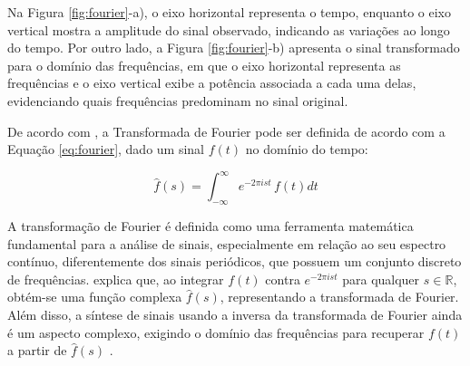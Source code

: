 
Na Figura \ref{fig:fourier}-a), o eixo horizontal representa o tempo, enquanto o eixo vertical mostra a amplitude do sinal observado, indicando as variações ao longo do tempo. Por outro lado, a Figura \ref{fig:fourier}-b) apresenta o sinal transformado para o domínio das frequências, em que o eixo horizontal representa as frequências e o eixo vertical exibe a potência associada a cada uma delas, evidenciando quais frequências predominam no sinal original.


De acordo com \citet{osgood1999}, a Transformada de Fourier pode ser definida de acordo com a Equação \eqref{eq:fourier}, dado um sinal $f(t)$ no domínio do tempo:

\begin{equation}
\hat{f}(s) = \int_{-\infty}^{\infty}  e^{-2 \pi i s t} \, f(t)dt
\label{eq:fourier}
\end{equation}

A transformação de Fourier é definida como uma ferramenta matemática fundamental para a análise de sinais, especialmente em relação ao seu espectro contínuo, diferentemente dos sinais periódicos, que possuem um conjunto discreto de frequências. \cite{osgood1999} explica que, ao integrar $f(t)$ contra \(e^{-2\pi ist}\) para qualquer \(s \in \mathbb{R}\), obtém-se uma função complexa $\hat{f}(s)$, representando a transformada de Fourier. Além disso, a síntese de sinais usando a inversa da transformada de Fourier ainda é um aspecto complexo, exigindo o domínio das frequências para recuperar $f(t)$ a partir de $\hat{f}(s)$ \citep{osgood1999}.

